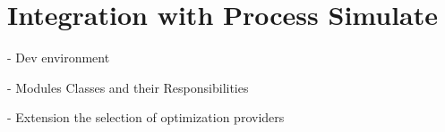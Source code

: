 \chapter{Integration with Process Simulate}

- Dev environment

- Modules Classes and their Responsibilities

- Extension the selection of optimization providers
